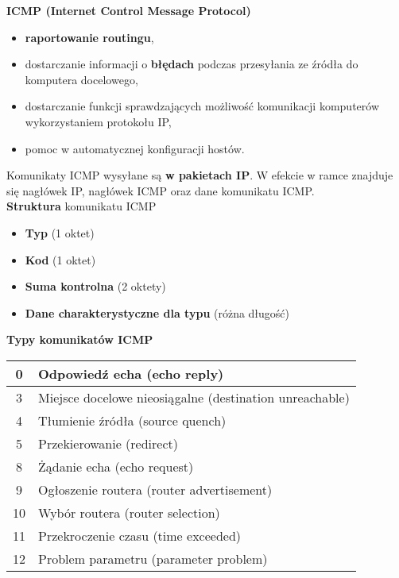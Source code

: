 \documentclass[../main.tex]{subfiles}
\begin{document}
    \textbf{ICMP (Internet Control Message Protocol)}
    \begin{itemize}
        \item \textbf{raportowanie routingu},
        \item dostarczanie informacji o \textbf{błędach} podczas przesyłania ze źródła do komputera docelowego,
        \item dostarczanie funkcji sprawdzających możliwość komunikacji komputerów wykorzystaniem protokołu IP,
        \item pomoc w automatycznej konfiguracji hostów.
    \end{itemize}
    Komunikaty ICMP wysyłane są \textbf{w pakietach IP}. W efekcie w ramce znajduje się nagłówek IP, nagłówek ICMP oraz dane komunikatu ICMP.\\

    \textbf{Struktura} komunikatu ICMP
    \begin{itemize}
        \item \textbf{Typ} (1 oktet)
        \item \textbf{Kod} (1 oktet)
        \item \textbf{Suma kontrolna} (2 oktety)
        \item \textbf{Dane charakterystyczne dla typu} (różna długość)
    \end{itemize}

    \textbf{Typy komunikatów ICMP}\\
    \begin{tabularx}{\textwidth}{|c| X |}
        \hline
        0 & Odpowiedź echa (echo reply)\\
        \hline
        3 & Miejsce docelowe nieosiągalne (destination unreachable)\\
        \hline
        4 & Tłumienie źródła (source quench)\\
        \hline
        5 & Przekierowanie (redirect)\\
        \hline
        8 & Żądanie echa (echo request)\\
        \hline
        9 & Ogłoszenie routera (router advertisement)\\
        \hline
        10 & Wybór routera (router selection)\\
        \hline
        11 & Przekroczenie czasu (time exceeded)\\
        \hline
        12 & Problem parametru (parameter problem)\\
        \hline
    \end{tabularx}
\end{document}
